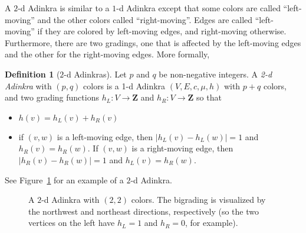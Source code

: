 \documentclass[12pt,twoside,singlespace]{article}
\numberwithin{equation}{section}
\theoremstyle{definition}
\newtheorem{definition}[equation]{Definition}
\newcommand{\ZZ}{\mathbf{Z}}
\begin{document}
A $2$-d Adinkra is similar to a $1$-d Adinkra except that some colors are called ``left-moving'' and the other colors called ``right-moving''.  Edges are called ``left-moving'' if they are colored by left-moving edges, and right-moving otherwise.  Furthermore, there are two gradings, one that is affected by the left-moving edges and the other for the right-moving edges. More formally,
\begin{definition}[$2$-d Adinkras]
Let $p$ and $q$ be non-negative integers. A \emph{2-d Adinkra} with $(p,q)$ colors is a 1-d Adinkra $(V,E,c,\mu,h)$ with $p+q$ colors, and two grading functions $h_L:V\to \ZZ$ and $h_R:V\to \ZZ$ so that
\begin{itemize}
\item $h(v)=h_L(v)+h_R(v)$
\item if $(v,w)$ is a left-moving edge, then $|h_L(v)-h_L(w)|=1$ and $h_R(v)=h_R(w)$.  If $(v,w)$ is a right-moving edge, then $|h_R(v)-h_R(w)|=1$ and $h_L(v)=h_R(w)$.
\end{itemize}

See Figure~\ref{fig:2d-example} for an example of a $2$-d Adinkra.
\end{definition}

\begin{figure}[htb]
\begin{center}

\caption{A $2$-d Adinkra with $(2,2)$ colors. The bigrading is visualized by the northwest and northeast directions, respectively (so the two vertices on the left have $h_L = 1$ and $h_R = 0$, for example). \label{fig:2d-example}}
\end{center}
\end{figure}
\end{document}
